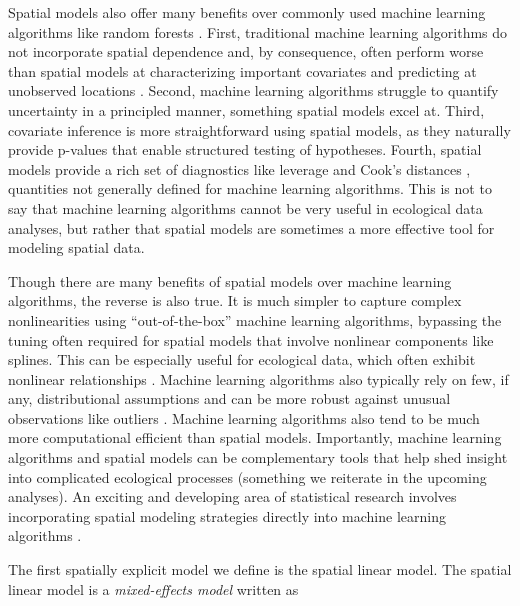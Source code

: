 \documentclass[
  letterpaper,
  DIV=11,
  numbers=noendperiod]{scrartcl}
\begin{document}
Spatial models also offer many benefits over commonly used machine
learning algorithms like random forests
\citep{breiman2001random, cutler2007random, james2017introduction, kuhn2022tidy}.
First, traditional machine learning algorithms do not incorporate
spatial dependence and, by consequence, often perform worse than spatial
models at characterizing important covariates and predicting at
unobserved locations \citep{fox2020comparing}. Second, machine learning
algorithms struggle to quantify uncertainty in a principled manner,
something spatial models excel at. Third, covariate inference is more
straightforward using spatial models, as they naturally provide p-values
that enable structured testing of hypotheses. Fourth, spatial models
provide a rich set of diagnostics like leverage and Cook's distances
\citep{montgomery2021introduction}, quantities not generally defined for
machine learning algorithms. This is not to say that machine learning
algorithms cannot be very useful in ecological data analyses, but rather
that spatial models are sometimes a more effective tool for modeling
spatial data.

Though there are many benefits of spatial models over machine learning
algorithms, the reverse is also true. It is much simpler to capture
complex nonlinearities using ``out-of-the-box'' machine learning
algorithms, bypassing the tuning often required for spatial models that
involve nonlinear components like splines. This can be especially useful
for ecological data, which often exhibit nonlinear relationships
\citep{fox2017assessing}. Machine learning algorithms also typically
rely on few, if any, distributional assumptions and can be more robust
against unusual observations like outliers \citep{hastie2009elements}.
Machine learning algorithms also tend to be much more computational
efficient than spatial models. Importantly, machine learning algorithms
and spatial models can be complementary tools that help shed insight
into complicated ecological processes (something we reiterate in the
upcoming analyses). An exciting and developing area of statistical
research involves incorporating spatial modeling strategies directly
into machine learning algorithms
\citep{saha2023random, heaton2025scalable}.

The first spatially explicit model we define is the spatial linear
model. The spatial linear model is a \emph{mixed-effects model}
\citep{pinheiro2000mixed, bolker2015linear} written as
\end{document}
